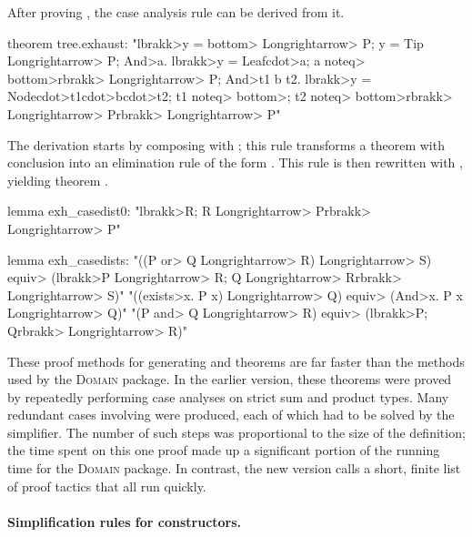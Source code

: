 After proving , the case analysis rule  can be derived from it.
%
\begin{isacode}
theorem tree.exhaust:
  "\<lbrakk>y = \<bottom> \<Longrightarrow> P; y = Tip \<Longrightarrow> P; \<And>a. \<lbrakk>y = Leaf\<cdot>a; a \<noteq> \<bottom>\<rbrakk> \<Longrightarrow> P;
    \<And>t1 b t2. \<lbrakk>y = Node\<cdot>t1\<cdot>b\<cdot>t2; t1 \<noteq> \<bottom>; t2 \<noteq> \<bottom>\<rbrakk> \<Longrightarrow> P\<rbrakk> \<Longrightarrow> P"
\end{isacode}
%
The derivation starts by composing  with ; this rule transforms a theorem with conclusion  into an elimination rule of the form . This rule is then rewritten with , yielding theorem .
%
\begin{isacode}
lemma exh_casedist0: "\<lbrakk>R; R \<Longrightarrow> P\<rbrakk> \<Longrightarrow> P"
\end{isacode}
\unmedskip
{}
\begin{isacode}
lemma exh_casedists:
  "((P \<or> Q \<Longrightarrow> R) \<Longrightarrow> S) \<equiv> (\<lbrakk>P \<Longrightarrow> R; Q \<Longrightarrow> R\<rbrakk> \<Longrightarrow> S)"
  "((\<exists>x. P x) \<Longrightarrow> Q) \<equiv> (\<And>x. P x \<Longrightarrow> Q)"
  "(P \<and> Q \<Longrightarrow> R) \<equiv> (\<lbrakk>P; Q\<rbrakk> \<Longrightarrow> R)"
\end{isacode}

These proof methods for generating  and  theorems are far faster than the methods used by the  \textsc{Domain} package. In the earlier version, these theorems were proved by repeatedly performing case analyses on strict sum and product types. Many redundant cases involving  were produced, each of which had to be solved by the simplifier. The number of such steps was proportional to the size of the definition; the time spent on this one proof made up a significant portion of the running time for the \textsc{Domain} package. In contrast, the new version calls a short, finite list of proof tactics that all run quickly.

\paragraph{Simplification rules for constructors.}

